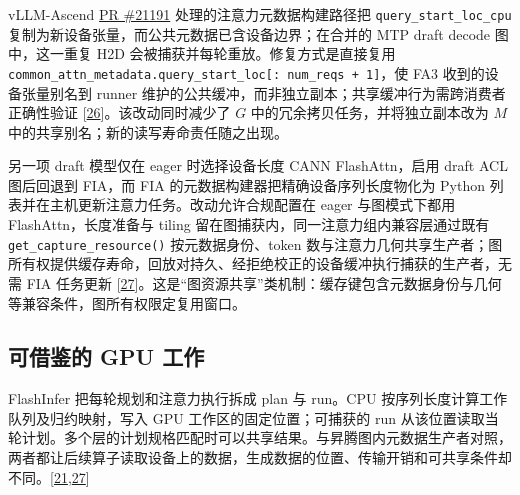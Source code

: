 \documentclass[
  UTF8,
  zihao=5]{ctexart}
\begin{document}
vLLM-Ascend
\href{https://github.com/vllm-project/vllm-ascend/pull/21191}{PR
\#21191} 处理的注意力元数据构建路径把 \texttt{query\_start\_loc\_cpu}
复制为新设备张量，而公共元数据已含设备边界；在合并的 MTP draft decode
图中，这一重复 H2D 会被捕获并每轮重放。修复方式是直接复用
\texttt{common\_attn\_metadata.query\_start\_loc{[}:\ num\_reqs\ +\ 1{]}}，使
FA3 收到的设备张量别名到 runner
维护的公共缓冲，而非独立副本；共享缓冲行为需跨消费者正确性验证
{[}\protect\hyperlink{ref-vllmascendpr21191}{26}{]}。该改动同时减少了
\(G\) 中的冗余拷贝任务，并将独立副本改为 \(M\)
中的共享别名；新的读写寿命责任随之出现。

另一项 draft 模型仅在 eager 时选择设备长度 CANN FlashAttn，启用 draft
ACL 图后回退到 FIA，而 FIA 的元数据构建器把精确设备序列长度物化为 Python
列表并在主机更新注意力任务。改动允许合规配置在 eager 与图模式下都用
FlashAttn，长度准备与 tiling 留在图捕获内，同一注意力组内兼容层通过既有
\texttt{get\_capture\_resource()} 按元数据身份、token
数与注意力几何共享生产者；图所有权提供缓存寿命，回放对持久、经拒绝校正的设备缓冲执行捕获的生产者，无需
FIA 任务更新
{[}\protect\hyperlink{ref-vllmascendpr21281}{27}{]}。这是``图资源共享''类机制：缓存键包含元数据身份与几何等兼容条件，图所有权限定复用窗口。

\hypertarget{ux53efux501fux9274ux7684-gpu-ux5de5ux4f5c-2}{%
\subsection{可借鉴的 GPU
工作}\label{ux53efux501fux9274ux7684-gpu-ux5de5ux4f5c-2}}

FlashInfer 把每轮规划和注意力执行拆成 plan 与 run。CPU
按序列长度计算工作队列及归约映射，写入 GPU 工作区的固定位置；可捕获的
run
从该位置读取当轮计划。多个层的计划规格匹配时可以共享结果。与昇腾图内元数据生产者对照，两者都让后续算子读取设备上的数据，生成数据的位置、传输开销和可共享条件却不同。{[}\protect\hyperlink{ref-ye2025flashinfer}{21},\protect\hyperlink{ref-vllmascendpr21281}{27}{]}
\end{document}
